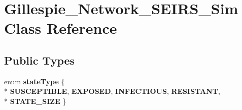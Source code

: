 \hypertarget{classGillespie__Network__SEIRS__Sim}{}\section{Gillespie\+\_\+\+Network\+\_\+\+S\+E\+I\+R\+S\+\_\+\+Sim Class Reference}
\label{classGillespie__Network__SEIRS__Sim}
\subsection*{Public Types}
\begin{DoxyCompactItemize}
\item 
\hypertarget{classGillespie__Network__SEIRS__Sim_abe4374e74f8a8693b420b1cd2eaeadfe}{}enum {\bfseries state\+Type} \{ \\*
{\bfseries S\+U\+S\+C\+E\+P\+T\+I\+B\+L\+E}, 
{\bfseries E\+X\+P\+O\+S\+E\+D}, 
{\bfseries I\+N\+F\+E\+C\+T\+I\+O\+U\+S}, 
{\bfseries R\+E\+S\+I\+S\+T\+A\+N\+T}, 
\\*
{\bfseries S\+T\+A\+T\+E\+\_\+\+S\+I\+Z\+E}
 \}\label{classGillespie__Network__SEIRS__Sim_abe4374e74f8a8693b420b1cd2eaeadfe}

\end{DoxyCompactItemize}

